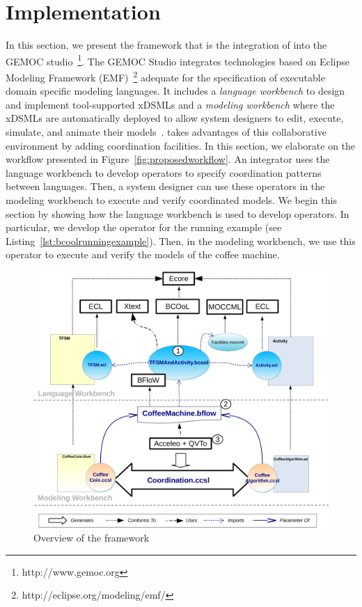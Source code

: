 \section{Implementation}
\label{section:bcoollengbench}
In this section, we present the \bcool framework that is the integration of \bcool into the GEMOC studio~\footnote{http://www.gemoc.org}. The GEMOC Studio integrates technologies based on Eclipse Modeling Framework (EMF)~\footnote{http://eclipse.org/modeling/emf/} adequate for the specification of executable domain specific modeling languages. It includes a \emph{language workbench} to design and implement tool-supported xDSMLs and a \emph{modeling workbench} where the xDSMLs are automatically deployed to allow system designers to edit, execute, simulate, and animate their models~\cite{ttc15bib}. \bcool takes advantages of this collaborative environment by adding coordination facilities. In this section, we elaborate on the workflow presented in Figure~\ref{fig:proposedworkflow}. An integrator uses the language workbench to develop \bcool operators to specify coordination patterns between languages. Then, a system designer can use these operators in the modeling workbench to execute and verify coordinated models. We begin this section by showing how the language workbench is used to develop \bcool operators. In particular, we develop the operator for the running example (see Listing~\ref{lst:bcoolrunningexample}). Then, in the modeling workbench, we use this operator to execute and verify the models of the coffee machine. 
\begin{figure}[h]
	\begin{center}
		\includegraphics[width=1\textwidth]{bcool/figs/bcooltechnos}
		\caption{Overview of the \bcool framework}
		\label{fig:bcooltechnos}
	\end{center}
\end{figure}

